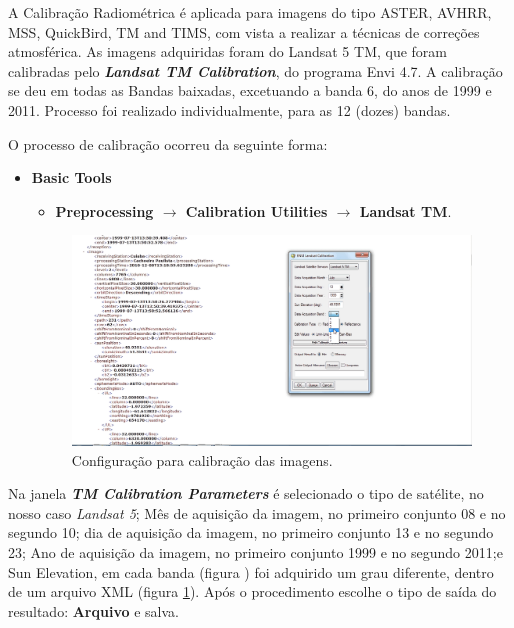 \hspace{1.5cm}
A Calibração Radiométrica é aplicada para imagens do tipo ASTER, AVHRR, MSS, QuickBird, TM and TIMS, com vista a realizar a técnicas de correções atmosférica. As imagens adquiridas foram do Landsat 5 TM, que foram calibradas pelo \textbf{\textit{Landsat TM Calibration}}, do programa Envi 4.7. A calibração se deu em todas as Bandas baixadas, excetuando a banda 6, do anos de 1999 e 2011. Processo foi realizado individualmente, para as 12 (dozes) bandas.

\hspace{1.5cm}
O processo de calibração ocorreu da seguinte forma:
\begin{itemize}
\item \textbf{Basic Tools}
\begin{itemize}
\item \textbf{Preprocessing  $\rightarrow$  Calibration Utilities  $\rightarrow$  Landsat TM}.\\
\end{itemize}
\begin{figure}[h!]
\centering
\includegraphics[scale=0.3]{imagens/calibracao03.png}
\caption{Configuração para calibração das imagens.}
\label{calibracao03}
\end{figure}

\end{itemize}
\hspace{1.5cm} Na janela \textbf{\textit{TM Calibration Parameters}} é selecionado o tipo de satélite, no nosso caso \textit{Landsat 5}; Mês de aquisição da imagem, no primeiro conjunto  08 e no segundo 10; dia de aquisição da imagem, no primeiro conjunto  13 e no segundo 23; Ano de aquisição da imagem, no primeiro conjunto  1999 e no segundo 2011;e Sun Elevation, em cada banda (figura ) foi adquirido um grau diferente, dentro de um arquivo XML (figura \ref{calibracao03}).
Após o procedimento escolhe o tipo de saída do resultado: \textbf{Arquivo} e salva.